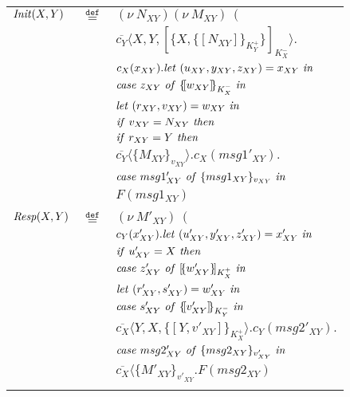 \documentclass[10pt,a4paper,final,oneside,fleqn]{book}
\newcommand*{\eqdef}{\mathbin{\mathop{=}\limits^{\texttt{def}}}}
\begin{document}
\begin{figure}[!bht]
\begin{center}
\begin{tabular}{|lll|}
\hline
$\mbox{{\itshape Init\/}}(X,Y)$&$\eqdef$&$(\nu~\!N_{XY})(\nu~\!M_{XY})~~($\\
&&$\overline{c_{Y}}\langle X,Y,[\!\{X,\{\![N_{XY}]\!\}_{K^+_{Y}}\}\!]_{K^-_{X}}\rangle.$\\
&&$c_{X}(x_{XY}).\mbox{{\itshape let\/} }(u_{XY},y_{XY},z_{XY})=x_{XY}\mbox{ {\itshape in\/}}$\\
&&$\mbox{{\itshape case\/} }z_{XY}\mbox{ {\itshape of\/} }\{\![w_{XY}]\!\}_{K^-_{X}}\mbox{ {\itshape in\/}}$\\
&&$\mbox{{\itshape let\/} }(r_{XY},v_{XY})=w_{XY}\mbox{ {\itshape in\/}}$\\
&&$\mbox{{\itshape if\/} }v_{XY}=N_{XY}\mbox{ {\itshape then\/}}$\\
&&$\mbox{{\itshape if\/} }r_{XY}=Y\mbox{ {\itshape then\/}}$\\
&&$\overline{c_{Y}}\langle\{M_{XY}\}_{v_{XY}}\rangle.c_{X}(msg1'_{XY}).$\\
&&$\mbox{{\itshape case\/} }msg1'_{XY}\mbox{ {\itshape of\/} }\{msg1_{XY}\}_{v_{XY}}\mbox{ {\itshape in\/}}$\\
&&$F(msg1_{XY})$\\&&\\
$\mbox{{\itshape Resp\/}}(X,Y)$&$\eqdef$&$(\nu~\!M'_{XY})~~($\\
&&$c_{Y}(x'_{XY}).\mbox{{\itshape let\/} }(u'_{XY},y'_{XY},z'_{XY})=x'_{XY}\mbox{ {\itshape in\/}}$\\
&&$\mbox{{\itshape if\/} }u'_{XY}=X\mbox{ {\itshape then\/}}$\\
&&$\mbox{{\itshape case\/} }z'_{XY}\mbox{ {\itshape of\/} }[\!\{w'_{XY}\}\!]_{K^+_{X}}\mbox{ {\itshape in\/}}$\\
&&$\mbox{{\itshape let\/} }(r'_{XY},s'_{XY})=w'_{XY}\mbox{ {\itshape in\/}}$\\
&&$\mbox{{\itshape case\/} }s'_{XY}\mbox{ {\itshape of\/} }\{\![v'_{XY}]\!\}_{K^-_{Y}}\mbox{ {\itshape in\/}}$\\
&&$\overline{c_{X}}\langle Y,X,\{\![Y,v'_{XY}]\!\}_{K^+_{X}}\rangle.c_{Y}( msg2'_{XY}).$\\
&&$\mbox{{\itshape case\/} }msg2'_{XY}\mbox{ {\itshape of\/} }\{msg2_{XY}\}_{v'_{XY}}\mbox{ {\itshape in\/}}$\\
&&$\overline{c_{X}}\langle\{M'_{XY}\}_{v'_{XY}}.F(msg2_{XY})$\\&&\\

\end{tabular}
\end{center}
\end{figure}
\end{document}
